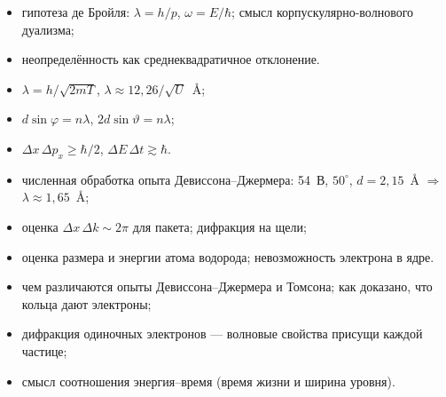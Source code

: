 \begin{examcheck}
\begin{itemize}
 \item гипотеза де Бройля: $\lambda=h/p$, $\omega=E/\hbar$; смысл корпускулярно-волнового дуализма;
 \item неопределённость как среднеквадратичное отклонение.
\end{itemize}
\begin{itemize}
 \item $\lambda=h/\sqrt{2mT}$, $\lambda\approx12{,}26/\sqrt{U}$~Å;
 \item $d\sin\varphi=n\lambda$, $2d\sin\vartheta=n\lambda$;
 \item $\Delta x\,\Delta p_x\ge\hbar/2$, $\Delta E\,\Delta t\gtrsim\hbar$.
\end{itemize}
\begin{itemize}
 \item численная обработка опыта Девиссона--Джермера: 54~В, $50^\circ$, $d=2{,}15$~Å $\Rightarrow$ $\lambda\approx1{,}65$~Å;
 \item оценка $\Delta x\,\Delta k\sim2\pi$ для пакета; дифракция на щели;
 \item оценка размера и энергии атома водорода; невозможность электрона в ядре.
\end{itemize}
\begin{itemize}
 \item чем различаются опыты Девиссона--Джермера и Томсона; как доказано, что кольца дают электроны;
 \item дифракция одиночных электронов — волновые свойства присущи каждой частице;
 \item смысл соотношения энергия--время (время жизни и ширина уровня).
\end{itemize}
\end{examcheck}
